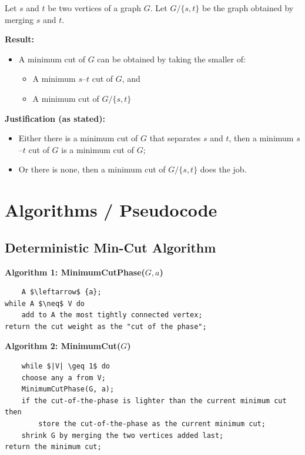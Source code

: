 \documentclass[11pt]{article}
\begin{document}
Let \( s \) and \( t \) be two vertices of a graph \( G \).  
Let \( G / \{s, t\} \) be the graph obtained by merging \( s \) and \( t \).

\textbf{Result:}

\begin{itemize}
    \item A minimum cut of \( G \) can be obtained by taking the smaller of:
    \begin{itemize}
        \item A minimum \( s \)--\( t \) cut of \( G \), and
        \item A minimum cut of \( G / \{s, t\} \)
    \end{itemize}
\end{itemize}

\textbf{Justification (as stated):}

\begin{itemize}
    \item Either there is a minimum cut of \( G \) that separates \( s \) and \( t \), then a minimum \( s \)--\( t \) cut of \( G \) is a minimum cut of \( G \);
    \item Or there is none, then a minimum cut of \( G / \{s, t\} \) does the job.
\end{itemize}

\section{Algorithms / Pseudocode}

\subsection{Deterministic Min-Cut Algorithm}

\textbf{Algorithm 1: MinimumCutPhase(\( G, a \))}

\begin{lstlisting}
    A $\leftarrow$ {a};
while A $\neq$ V do
    add to A the most tightly connected vertex;
return the cut weight as the "cut of the phase";
\end{lstlisting}



\textbf{Algorithm 2: MinimumCut(\( G \))}

\begin{lstlisting}
    while $|V| \geq 1$ do
    choose any a from V;
    MinimumCutPhase(G, a);
    if the cut-of-the-phase is lighter than the current minimum cut then
        store the cut-of-the-phase as the current minimum cut;
    shrink G by merging the two vertices added last;
return the minimum cut;
\end{lstlisting}
\end{document}
